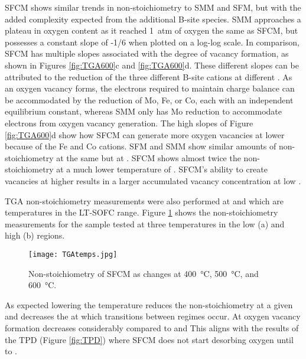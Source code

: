     SFCM shows similar trends in non-stoichiometry to SMM and SFM, but with the added complexity expected from the additional B-site species.
    SMM approaches a plateau in oxygen content as it reached \SI{1}{atm} of oxygen the same as SFCM, but possesses a constant slope of -1/6 when plotted on a log-log scale.\cite{Marrero-lopez2010}
    In comparison, SFCM has multiple slopes associated with the degree of vacancy formation, as shown in Figures \ref{fig:TGA600}c and \ref{fig:TGA600}d.
    These different slopes can be attributed to the reduction of the three different B-site cations at different .
    As an oxygen vacancy forms, the electrons required to maintain charge balance can be accommodated by the reduction of Mo, Fe, or Co, each with an independent equilibrium constant, whereas SMM only has Mo reduction to accommodate electrons from oxygen vacancy generation.
    The high slopes of Figure \ref{fig:TGA600}d show how SFCM can generate more oxygen vacancies at lower  because of the Fe and Co cations.
    SFM and SMM show similar amounts of non-stoichiometry at the same  but at .\cite{Kircheisen2012}
    SFCM shows almost twice the non-stoichiometry at a much lower temperature of .
    SFCM's ability to create vacancies at higher  results in a larger accumulated vacancy concentration at low .

    TGA non-stoichiometry measurements were also performed at  and  which are temperatures in the LT-SOFC range.
    Figure \ref{fig:TGAtemps} shows the non-stoichiometry measurements for the sample  tested at three temperatures in the low  (a) and high  (b) regions.

    \begin{figure}
      \texttt{[image: TGAtemps.jpg]}
      \caption{Non-stoichiometry of SFCM as  changes at \SI{400}{\celsius}, \SI{500}{\celsius}, and \SI{600}{\celsius}.}
      \label{fig:TGAtemps}
    \end{figure}

    As expected lowering the temperature reduces the non-stoichiometry at a given  and decreases the  at which transitions between regimes occur.
    At  oxygen vacancy formation decreases considerably compared to  and 
    This aligns with the results of the TPD (Figure \ref{fig:TPD}) where SFCM does not start desorbing oxygen until  to .

